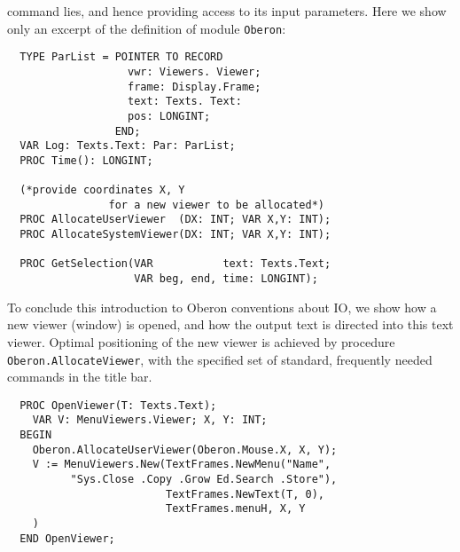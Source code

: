 command lies, and hence providing access to its input parameters. Here we show only an
excerpt of the definition of module \verb|Oberon|:
\begin{verbatim}
  TYPE ParList = POINTER TO RECORD
                   vwr: Viewers. Viewer;
                   frame: Display.Frame;
                   text: Texts. Text:
                   pos: LONGINT;
                 END;
  VAR Log: Texts.Text: Par: ParList;
  PROC Time(): LONGINT;

  (*provide coordinates X, Y
                for a new viewer to be allocated*)
  PROC AllocateUserViewer  (DX: INT; VAR X,Y: INT);
  PROC AllocateSystemViewer(DX: INT; VAR X,Y: INT);
 
  PROC GetSelection(VAR           text: Texts.Text;
                    VAR beg, end, time: LONGINT);
\end{verbatim}
To conclude this introduction to Oberon conventions about IO, we show how a new viewer
(window) is opened, and how the output text is directed into this text viewer. Optimal
positioning of the new viewer is achieved by procedure \verb|Oberon.AllocateViewer|,
with the specified set of standard, frequently needed commands in the title bar.
\begin{verbatim}
  PROC OpenViewer(T: Texts.Text);
    VAR V: MenuViewers.Viewer; X, Y: INT;
  BEGIN
    Oberon.AllocateUserViewer(Oberon.Mouse.X, X, Y);
    V := MenuViewers.New(TextFrames.NewMenu("Name",
          "Sys.Close .Copy .Grow Ed.Search .Store"),
                         TextFrames.NewText(T, 0),
                         TextFrames.menuH, X, Y
    )
  END OpenViewer;
\end{verbatim}
